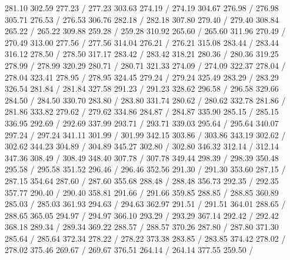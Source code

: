 { 281.10 302.59 277.23 /
 277.23 303.63 274.19 /
 274.19 304.67 276.98 /
 276.98 305.71 276.53 /
 276.53 306.76 282.18 /
 282.18 307.80 279.40 /
 279.40 308.84 265.22 /
 265.22 309.88 259.28 /
 259.28 310.92 265.60 /
 265.60 311.96 270.49 /
 270.49 313.00 277.56 /
 277.56 314.04 276.21 /
 276.21 315.08 283.44 /
 283.44 316.12 278.50 /
 278.50 317.17 283.42 /
 283.42 318.21 280.36 /
 280.36 319.25 278.99 /
 278.99 320.29 280.71 /
 280.71 321.33 274.09 /
 274.09 322.37 278.04 /
 278.04 323.41 278.95 /
 278.95 324.45 279.24 /
 279.24 325.49 283.29 /
 283.29 326.54 281.84 /
 281.84 327.58 291.23 /
 291.23 328.62 296.58 /
 296.58 329.66 284.50 /
 284.50 330.70 283.80 /
 283.80 331.74 280.62 /
 280.62 332.78 281.86 /
 281.86 333.82 279.62 /
 279.62 334.86 284.87 /
 284.87 335.90 285.15 /
 285.15 336.95 292.69 /
 292.69 337.99 293.71 /
 293.71 339.03 295.64 /
 295.64 340.07 297.24 /
 297.24 341.11 301.99 /
 301.99 342.15 303.86 /
 303.86 343.19 302.62 /
 302.62 344.23 304.89 /
 304.89 345.27 302.80 /
 302.80 346.32 312.14 /
 312.14 347.36 308.49 /
 308.49 348.40 307.78 /
 307.78 349.44 298.39 /
 298.39 350.48 295.58 /
 295.58 351.52 296.46 /
 296.46 352.56 291.30 /
 291.30 353.60 287.15 /
 287.15 354.64 287.60 /
 287.60 355.68 288.48 /
 288.48 356.73 292.35 /
 292.35 357.77 290.40 /
 290.40 358.81 291.66 /
 291.66 359.85 288.85 /
 288.85 360.89 285.03 /
 285.03 361.93 294.63 /
 294.63 362.97 291.51 /
 291.51 364.01 288.65 /
 288.65 365.05 294.97 /
 294.97 366.10 293.29 /
 293.29 367.14 292.42 /
 292.42 368.18 289.34 /
 289.34 369.22 288.57 /
 288.57 370.26 287.80 /
 287.80 371.30 285.64 /
 285.64 372.34 278.22 /
 278.22 373.38 283.85 /
 283.85 374.42 278.02 /
 278.02 375.46 269.67 /
 269.67 376.51 264.14 /
 264.14 377.55 259.50 /
}
